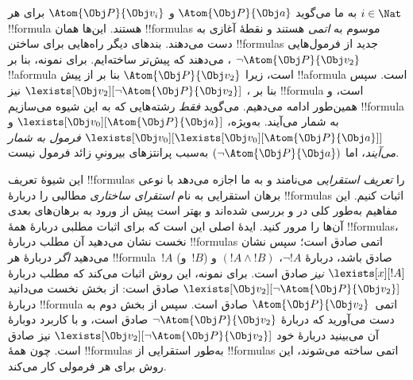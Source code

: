 \documentclass[../../../include/open-logic-section]{subfiles}
\begin{document}
 به ما می‌گوید $\Atom{\Obj P}{\Obj a}$ و
$\Atom{\Obj P}{\Obj v_i}$ برای هر $i \in \Nat$ !!{formula} هستند.
این‌ها همان !!{formula}s موسوم به \emph{اتمی} هستند و نقطهٔ آغازی به
دست می‌دهند. بندهای دیگر راه‌هایی برای ساختن !!{formula}s جدید از
فرمول‌هایی می‌دهند که پیش‌تر ساخته‌ایم. برای نمونه، بنا بر
، $\lnot \Atom{\Obj P}{\Obj v_2}$ !!a{formula} است،
زیرا $\Atom{\Obj P}{\Obj v_2}$ بنا بر  از پیش
!!a{formula} است. سپس بنا بر ،
$\lexists[\Obj v_2][\lnot \Atom{\Obj P}{\Obj v_2}]$ نیز
!!{formula} است، و همین‌طور ادامه می‌دهیم.  می‌گوید
\emph{فقط} رشته‌هایی که به این شیوه می‌سازیم !!{formula} به شمار
می‌آیند. به‌ویژه، $\lexists[\Obj v_0][\Atom{\Obj P}{\Obj a}]$ و
$\lexists[\Obj v_0][\lexists[\Obj v_0][\Atom{\Obj P}{\Obj a}]]$
\emph{فرمول به شمار می‌آیند}، اما $(\lnot \Atom{\Obj P}{\Obj a})$
به‌سبب پرانتزهای بیرونیِ زائد فرمول نیست.

این شیوهٔ تعریف !!{formula}s را \emph{تعریف استقرایی} می‌نامند و به ما
اجازه می‌دهد با نوعی برهان استقرایی به نام \emph{استقرای ساختاری}
مطالبی را دربارهٔ !!{formula}s اثبات کنیم. این مفاهیم به‌طور کلی در
 و  بررسی شده‌اند
و بهتر است پیش از ورود به برهان‌های بعدی آن‌ها را مرور کنید. ایدهٔ
اصلی این است که برای اثبات مطلبی دربارهٔ همهٔ !!{formula}s، نخست نشان
می‌دهید آن مطلب دربارهٔ !!{formula}s اتمی صادق است؛ سپس نشان می‌دهید
\emph{اگر} دربارهٔ هر !!{formula}~$!A$ (و~$!B$) صادق باشد، دربارهٔ
$\lnot !A$، $(!A \land !B)$ و $\lexists[x][!A]$ \emph{نیز} صادق است.
برای نمونه، این روش اثبات می‌کند که مطلب دربارهٔ
$\lexists[\Obj v_2][\lnot \Atom{\Obj P}{\Obj v_2}]$ صادق است: از بخش
نخست می‌دانید دربارهٔ !!{formula} اتمی~$\Atom{\Obj P}{\Obj v_2}$ صادق
است. سپس از بخش دوم به دست می‌آورید که دربارهٔ
$\lnot \Atom{\Obj P}{\Obj v_2}$ صادق است، و با کاربرد دوبارهٔ آن
می‌بینید دربارهٔ خود $\lexists[\Obj v_2][\lnot \Atom{\Obj P}{\Obj
v_2}]$ نیز صادق است. چون همهٔ !!{formula}s به‌طور استقرایی از
!!{formula}s اتمی ساخته می‌شوند، این روش برای هر فرمولی کار می‌کند.
\end{document}
